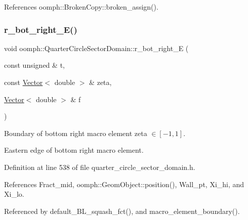 References oomph\+::\+Broken\+Copy\+::broken\+\_\+assign().

\mbox{\label{classoomph_1_1QuarterCircleSectorDomain_abb05f2e719d81f167fc0f608e80c5696}} 
\subsubsection{\texorpdfstring{r\+\_\+bot\+\_\+right\+\_\+\+E()}{r\_bot\_right\_E()}}
{\footnotesize\ttfamily void oomph\+::\+Quarter\+Circle\+Sector\+Domain\+::r\+\_\+bot\+\_\+right\+\_\+E (\begin{DoxyParamCaption}\item[{const unsigned \&}]{t,  }\item[{const \hyperlink{classoomph_1_1Vector}{Vector}$<$ double $>$ \&}]{zeta,  }\item[{\hyperlink{classoomph_1_1Vector}{Vector}$<$ double $>$ \&}]{f }\end{DoxyParamCaption})\hspace{0.3cm}{\ttfamily [private]}}



Boundary of bottom right macro element zeta $ \in [-1,1] $. 

Eastern edge of bottom right macro element. 

Definition at line 538 of file quarter\+\_\+circle\+\_\+sector\+\_\+domain.\+h.



References Fract\+\_\+mid, oomph\+::\+Geom\+Object\+::position(), Wall\+\_\+pt, Xi\+\_\+hi, and Xi\+\_\+lo.



Referenced by default\+\_\+\+B\+L\+\_\+squash\+\_\+fct(), and macro\+\_\+element\+\_\+boundary().

\mbox{\label{classoomph_1_1QuarterCircleSectorDomain_ad937b0da664b5c01063e7f8de6427fce}} 
